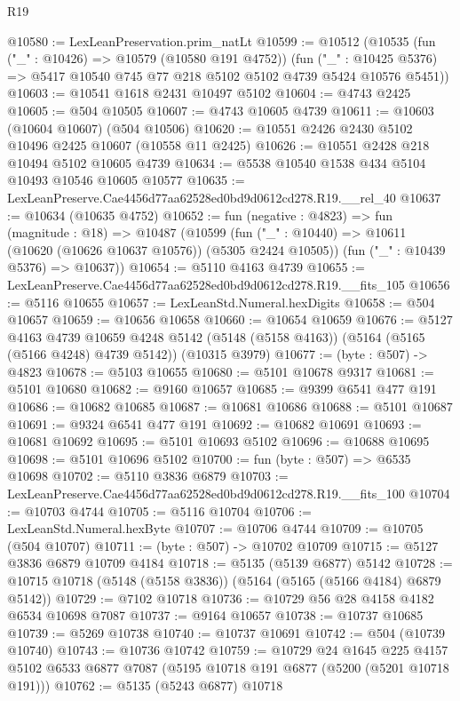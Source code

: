 \begin{lexlean}{R19}
\begin{coremodule}
{{{{{{{{{{{@10580 := LexLeanPreservation.prim_natLt
@10599 := @10512
    (@10535
      (fun ("_" : @10426) => @10579 (@10580 @191 @4752))
      (fun ("_" : @10425 @5376) => @5417 @10540 @745 @77 @218 @5102 @5102 @4739 @5424 @10576 @5451))
@10603 := @10541 @1618 @2431 @10497 @5102
@10604 := @4743 @2425
@10605 := @504 @10505
@10607 := @4743 @10605 @4739
@10611 := @10603 (@10604 @10607) (@504 @10506)
@10620 := @10551 @2426 @2430 @5102 @10496 @2425 @10607 (@10558 @11 @2425)
@10626 := @10551 @2428 @218 @10494 @5102 @10605 @4739
@10634 := @5538 @10540 @1538 @434 @5104 @10493 @10546 @10605 @10577
@10635 := LexLeanPreserve.Cae4456d77aa62528ed0bd9d0612cd278.R19.__rel_40
@10637 := @10634 (@10635 @4752)
@10652 := fun (negative : @4823) =>
  fun (magnitude : @18) =>
  @10487
    (@10599
      (fun ("_" : @10440) => @10611 (@10620 (@10626 @10637 @10576)) (@5305 @2424 @10505))
      (fun ("_" : @10439 @5376) => @10637))
@10654 := @5110 @4163 @4739
@10655 := LexLeanPreserve.Cae4456d77aa62528ed0bd9d0612cd278.R19.__fits_105
@10656 := @5116 @10655
@10657 := LexLeanStd.Numeral.hexDigits
@10658 := @504 @10657
@10659 := @10656 @10658
@10660 := @10654 @10659
@10676 := @5127
    @4163
    @4739
    @10659
    @4248
    @5142
    (@5148 (@5158 @4163))
    (@5164 (@5165 (@5166 @4248) @4739 @5142))
    (@10315 @3979)
@10677 := (byte : @507) -> @4823
@10678 := @5103 @10655
@10680 := @5101 @10678 @9317
@10681 := @5101 @10680
@10682 := @9160 @10657
@10685 := @9399 @6541 @477 @191
@10686 := @10682 @10685
@10687 := @10681 @10686
@10688 := @5101 @10687
@10691 := @9324 @6541 @477 @191
@10692 := @10682 @10691
@10693 := @10681 @10692
@10695 := @5101 @10693 @5102
@10696 := @10688 @10695
@10698 := @5101 @10696 @5102
@10700 := fun (byte : @507) => @6535 @10698
@10702 := @5110 @3836 @6879
@10703 := LexLeanPreserve.Cae4456d77aa62528ed0bd9d0612cd278.R19.__fits_100
@10704 := @10703 @4744
@10705 := @5116 @10704
@10706 := LexLeanStd.Numeral.hexByte
@10707 := @10706 @4744
@10709 := @10705 (@504 @10707)
@10711 := (byte : @507) -> @10702 @10709
@10715 := @5127 @3836 @6879 @10709 @4184
@10718 := @5135 (@5139 @6877) @5142
@10728 := @10715 @10718 (@5148 (@5158 @3836)) (@5164 (@5165 (@5166 @4184) @6879 @5142))
@10729 := @7102 @10718
@10736 := @10729 @56 @28 @4158 @4182 @6534 @10698 @7087
@10737 := @9164 @10657
@10738 := @10737 @10685
@10739 := @5269 @10738
@10740 := @10737 @10691
@10742 := @504 (@10739 @10740)
@10743 := @10736 @10742
@10759 := @10729
    @24
    @1645
    @225
    @4157
    @5102
    @6533
    @6877
    @7087
    (@5195 @10718 @191 @6877 (@5200 (@5201 @10718 @191)))
@10762 := @5135 (@5243 @6877) @10718
}}}}}}}}}}}
\end{coremodule}
\end{lexlean}
